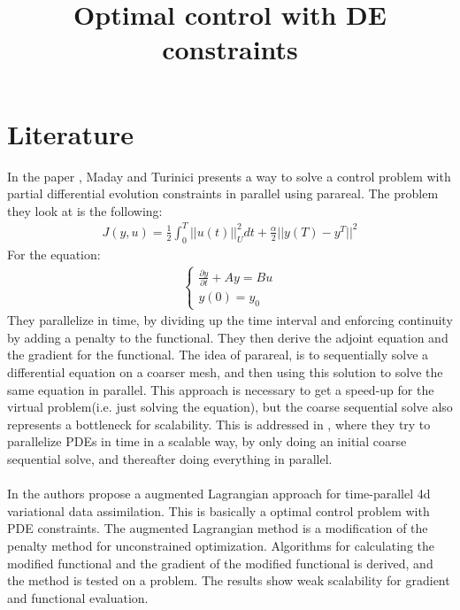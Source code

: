 \documentclass[11pt,a4paper]{article}
\title{Optimal control with DE constraints}
\begin{document}
\maketitle
\tableofcontents
\section{Literature}
In the paper \cite{maday2002parareal}, Maday and Turinici presents a way to solve a control problem with partial differential evolution constraints in parallel using parareal. The problem they look at is the following:
\begin{align*}
J(y,u) = \frac{1}{2}\int_0^T||u(t)||_U^2dt + \frac{\alpha}{2}||y(T)-y^T||^2
\end{align*} 
For the equation:
\begin{align*}
\left\{
     \begin{array}{lr}
       	\frac{\partial y}{\partial t}+Ay = Bu\\
       	   y(0)=y_0
     \end{array}
   \right.
\end{align*}
They parallelize in time, by dividing up the time interval and enforcing continuity by adding a penalty to the functional. They then derive the adjoint equation and the gradient for the functional. The idea of parareal, is to sequentially solve a differential equation on a coarser mesh, and then using this solution to solve the same equation in parallel. This approach is necessary to get a speed-up for the virtual problem(i.e. just solving the equation), but the coarse sequential solve also represents a bottleneck for scalability. This is addressed in \cite{rao2014adjoint}, where they try to parallelize PDEs in time in a scalable way, by only doing an initial coarse sequential solve, and thereafter doing everything in parallel.  
\\
\\
In \cite{rao2016time} the authors propose a augmented Lagrangian approach for time-parallel 4d variational data assimilation. This is basically a optimal control problem with PDE constraints. The augmented Lagrangian method is a modification of the penalty method for unconstrained optimization. Algorithms for calculating the modified functional and the gradient of the modified functional is derived, and the method is tested on a problem. The results show weak scalability for gradient and functional evaluation.  
\end{document}
